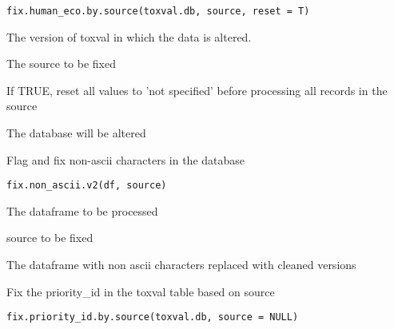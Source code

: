 \documentclass[letterpaper]{book}
\begin{document}
%
\begin{Usage}
\begin{verbatim}
fix.human_eco.by.source(toxval.db, source, reset = T)
\end{verbatim}
\end{Usage}
%
\begin{Arguments}
\begin{ldescription}
\item[\code{toxval.db}] The version of toxval in which the data is altered.

\item[\code{source}] The source to be fixed

\item[\code{reset}] If TRUE, reset all values to 'not specified' before processing all records in the source
\end{ldescription}
\end{Arguments}
%
\begin{Value}
The database will be altered
\end{Value}
%
\begin{Description}\relax
Flag and fix non-ascii characters in the database
\end{Description}
%
\begin{Usage}
\begin{verbatim}
fix.non_ascii.v2(df, source)
\end{verbatim}
\end{Usage}
%
\begin{Arguments}
\begin{ldescription}
\item[\code{df}] The dataframe to be processed

\item[\code{The}] source to be fixed
\end{ldescription}
\end{Arguments}
%
\begin{Value}
The dataframe with non ascii characters replaced with cleaned versions
\end{Value}
%
\begin{Description}\relax
Fix the priority\_id in the toxval table based on source
\end{Description}
%
\begin{Usage}
\begin{verbatim}
fix.priority_id.by.source(toxval.db, source = NULL)
\end{verbatim}
\end{Usage}
\end{document}

